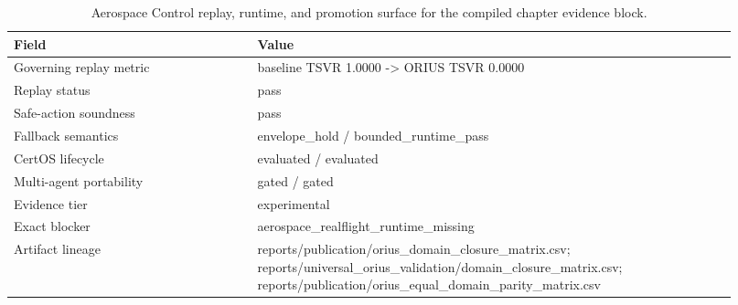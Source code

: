 \begin{table}[htbp]
\centering
\small
\caption{Aerospace Control replay, runtime, and promotion surface for the compiled chapter evidence block.}
\label{tab:aerospace-replay-surface}
\begin{tabular}{p{0.31\linewidth}p{0.61\linewidth}}
\toprule
\textbf{Field} & \textbf{Value}\\
\midrule
Governing replay metric & baseline TSVR 1.0000 -> ORIUS TSVR 0.0000\\
Replay status & pass\\
Safe-action soundness & pass\\
Fallback semantics & envelope\_hold / bounded\_runtime\_pass\\
CertOS lifecycle & evaluated / evaluated\\
Multi-agent portability & gated / gated\\
Evidence tier & experimental\\
Exact blocker & aerospace\_realflight\_runtime\_missing\\
Artifact lineage & reports/publication/orius\_domain\_closure\_matrix.csv; reports/universal\_orius\_validation/domain\_closure\_matrix.csv; reports/publication/orius\_equal\_domain\_parity\_matrix.csv\\
\bottomrule
\end{tabular}
\end{table}
